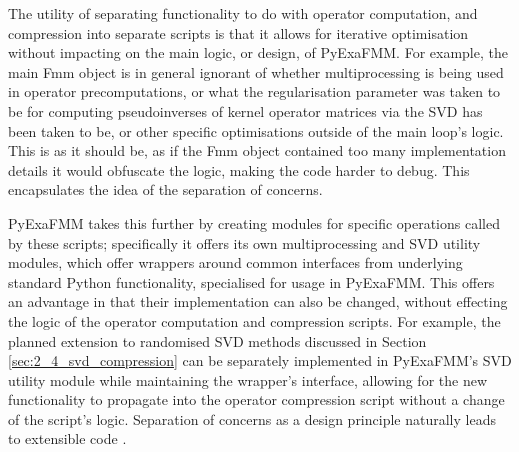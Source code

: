 The utility of separating functionality to do with operator computation, and
compression into separate scripts is that it allows for iterative optimisation
without impacting on the main logic, or design, of \gls{PyExaFMM}. For example,
the main Fmm object is in general ignorant of whether multiprocessing
is being used in operator precomputations, or what the regularisation parameter
was taken to be for computing pseudoinverses of kernel operator matrices
via the SVD has been taken to be, or other specific optimisations outside of the
main loop's logic. This is as it should be, as if the Fmm
object contained too many implementation details it would obfuscate the logic,
making the code harder to debug. This encapsulates the idea of the separation of
concerns.

\gls{PyExaFMM} takes this further by creating modules for specific
operations called by these scripts; specifically it offers its own multiprocessing
and SVD utility modules, which offer wrappers around common interfaces from
underlying standard Python functionality, specialised for usage in \gls{PyExaFMM}.
This offers an advantage in that their implementation can also be changed,
without effecting the logic of the operator computation and compression scripts.
For example, the planned extension to randomised \gls{SVD} methods discussed in
Section \ref{sec:2_4_svd_compression} can be separately implemented in \gls{PyExaFMM}'s
\gls{SVD} utility module while maintaining the wrapper's interface, allowing for the new
functionality to propagate into the operator compression script without
a change of the script's logic. Separation of concerns as a design
principle naturally leads to extensible code \cite{Gamma:1994:Addison}.
